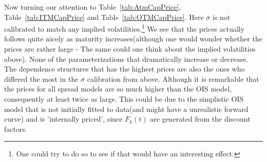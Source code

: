 \documentclass[12pt]{article}
\begin{document}
Now turning our attention to Table~\ref{tab:AtmCapPrice},
Table~\ref{tab:ITMCapPrice} and Table~\ref{tab:OTMCapPrice}.
Here $\sigma$ is not calibrated to match any implied volatilities.\footnote{One
could try to do so to see if that would have an interesting effect.}
We see that the prices actually follows quite nicely
as maturity increases(although one would wonder whether the prices are rather large - The
same could one think about the implied volatilities above).
None of the parameterizations that dramatically increase or decrease.
The dependence structures that has the highest prices
are also the ones who differed the most in the $\sigma$ calibration from above.
Although it is remarkable that
the prices for all spread models are so much higher than the OIS model, consequently
at least twice as large. This could be
due to the simplistic OIS model that is not initially fitted to data(and might have
a unrealistic forward curve) and is 'internally
priced', since $F_k(t)$ are generated from the discount factors.
\end{document}
